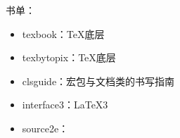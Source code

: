 \documentclass{ctexart}
\begin{document}
    \greet

    书单：
    \begin{itemize}
        \item texbook：\TeX 底层
        \item texbytopix：\TeX 底层
        \item clsguide：宏包与文档类的书写指南
        \item interface3：\LaTeX{}3
        \item source2e：
    \end{itemize}
\end{document}
